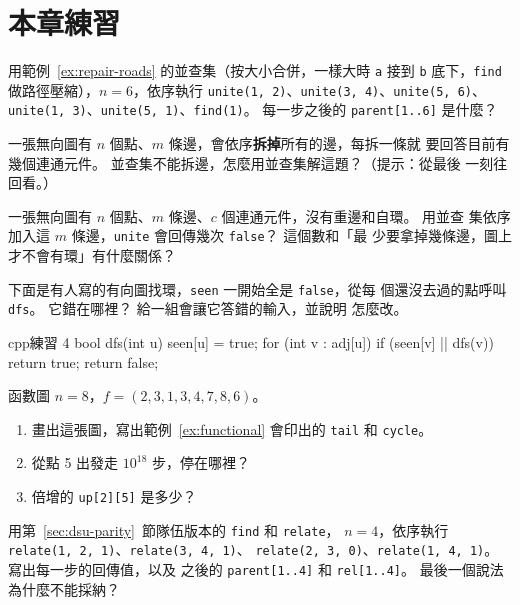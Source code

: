 \section{本章練習}
\label{sec:ch7-exercises}

\begin{drills}[label=drills:ch7]
\item 用範例~\ref{ex:repair-roads} 的並查集（按大小合併，一樣大時 \texttt{a} 接到
\texttt{b} 底下，\texttt{find} 做路徑壓縮），$n = 6$，依序執行
\texttt{unite(1, 2)}、\texttt{unite(3, 4)}、\texttt{unite(5, 6)}、
\texttt{unite(1, 3)}、\texttt{unite(5, 1)}、\texttt{find(1)}。 每一步之後的
\texttt{parent[1..6]} 是什麼？

\item 一張無向圖有 $n$ 個點、$m$ 條邊，會依序\textbf{拆掉}所有的邊，每拆一條就
要回答目前有幾個連通元件。 並查集不能拆邊，怎麼用並查集解這題？（提示：從最後
一刻往回看。）

\item 一張無向圖有 $n$ 個點、$m$ 條邊、$c$ 個連通元件，沒有重邊和自環。 用並查
集依序加入這 $m$ 條邊，\texttt{unite} 會回傳幾次 \texttt{false}？ 這個數和「最
少要拿掉幾條邊，圖上才不會有環」有什麼關係？

\item 下面是有人寫的有向圖找環，\texttt{seen} 一開始全是 \texttt{false}，從每
個還沒去過的點呼叫 \texttt{dfs}。 它錯在哪裡？ 給一組會讓它答錯的輸入，並說明
怎麼改。
\begin{code}{cpp}{練習 4}
bool dfs(int u) {
    seen[u] = true;
    for (int v : adj[u]) {
        if (seen[v] || dfs(v)) {
            return true;
        }
    }
    return false;
}
\end{code}

\item 函數圖 $n = 8$，$f = (2, 3, 1, 3, 4, 7, 8, 6)$。
\begin{enumerate}
\item 畫出這張圖，寫出範例~\ref{ex:functional} 會印出的 \texttt{tail} 和
\texttt{cycle}。
\item 從點 5 出發走 $10^{18}$ 步，停在哪裡？
\item 倍增的 \texttt{up[2][5]} 是多少？
\end{enumerate}

\item 用第~\ref{sec:dsu-parity}~節隊伍版本的 \texttt{find} 和 \texttt{relate}，
$n = 4$，依序執行 \texttt{relate(1, 2, 1)}、\texttt{relate(3, 4, 1)}、
\texttt{relate(2, 3, 0)}、\texttt{relate(1, 4, 1)}。 寫出每一步的回傳值，以及
之後的 \texttt{parent[1..4]} 和 \texttt{rel[1..4]}。 最後一個說法為什麼不能採納？


\end{drills}
